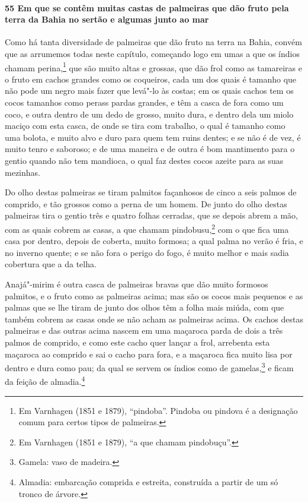 \paragraph{55 Em que se contêm muitas castas de palmeiras que dão fruto pela terra da
Bahia no sertão e algumas junto ao mar}

Como há tanta diversidade de palmeiras que dão fruto na terra na Bahia, convém que as
arrumemos todas neste capítulo, começando logo em umas a que os índios chamam
perina,\footnote{ Em Varnhagen (1851 e 1879), ``pindoba''. Pindoba ou pindova é a
designação comum para certos tipos de palmeiras.} que são muito altas e grossas, que dão
frol como as tamareiras e o fruto em cachos grandes como os coqueiros, cada um dos quais é
tamanho que não pode um negro mais fazer que levá"-lo às costas; em os quais cachos tem os
cocos tamanhos como perass pardas grandes, e têm a casca de fora como um coco, e outra
dentro de um dedo de grosso, muito dura, e dentro dela um miolo maciço com esta casca, de
onde se tira com trabalho, o qual é tamanho como uma bolota, e muito alvo e duro para quem
tem ruins dentes; e se não é de vez, é muito tenro e saboroso; e de uma maneira e de outra
é bom mantimento para o gentio quando não tem mandioca, o qual faz destes cocos azeite
para as suas mezinhas.

Do olho destas palmeiras se tiram palmitos façanhosos de cinco a seis palmos de comprido,
e tão grossos como a perna de um homem. De junto do olho destas palmeiras tira o gentio
três e quatro folhas cerradas, que se depois abrem a mão, com as quais cobrem as casas, a
que chamam pindobusu,\footnote{ Em Varnhagen (1851 e 1879), ``a que chamam pindobuçu''.}
com o que fica uma casa por dentro, depois de coberta, muito formosa; a qual palma no
verão é fria, e no inverno quente; e se não fora o perigo do fogo, é muito melhor e mais
sadia cobertura que a da telha.

Anajá"-mirim é outra casca de palmeiras bravas que dão muito formosos palmitos, e o fruto
como as palmeiras acima; mas são os cocos mais pequenos e as palmas que se lhe tiram de
junto dos olhos têm a folha mais miúda, com que também cobrem as casas onde se não acham
as palmeiras acima. Os cachos destas palmeiras e das outras acima nascem em uma maçaroca
parda de dois a três palmos de comprido, e como este cacho quer lançar a frol, arrebenta
esta maçaroca ao comprido e sai o cacho para fora, e a maçaroca fica muito lisa por dentro
e dura como pau; da qual se servem os índios como de gamelas,\footnote{ Gamela: vaso de
madeira.} e ficam da feição de almadia.\footnote{ Almadia: embarcação comprida e estreita,
construída a partir de um só tronco de árvore.}

